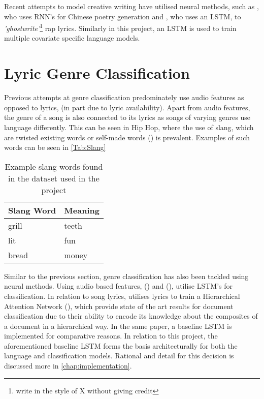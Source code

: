 \noindent
\newline
Recent attempts to model creative writing have utilised neural methods, such as \cite{Zhang2014}, who uses RNN's for Chinese poetry generation and \cite{Potash2015}, who uses an LSTM, to \textit{'ghostwrite'}\footnote{write in the style of X without giving credit} rap lyrics. Similarly in this project, an LSTM is used to train multiple covariate specific language models.

\section{Lyric Genre Classification}
Previous attempts at genre classification predominately use audio features as opposed to lyrics, (in part due to lyric availability). Apart from audio features, the genre of a song is also connected to its lyrics as songs of varying genres use language differently. This can be seen in Hip Hop, where the use of slang, which are twisted existing words or self-made words (\cite{Edwards2009}) is prevalent. Examples of such words can be seen in \autoref{Tab:Slang}
\begin{table}[ht]
	\centering
	\begin{tabular}{ | p{5cm} | p{5cm} |}
		\hline
		\textbf{Slang Word} & \textbf{Meaning}\\ \hline
		grill & teeth\\ \hline
		lit & fun\\ \hline
		bread & money \\ \hline
	\end{tabular}
	\caption[Example Slang Words]{Example slang words found in the dataset used in the project}
	\label{Tab:Slang}
\end{table}
\newline
Similar to the previous section, genre classification has also been tackled using neural methods. Using audio based features, (\cite{Irvin2016}) and (\cite{Pui2018}), utilise LSTM's for classification. In relation to song lyrics, \cite{Tsaptsinos2017} utilises lyrics to train a Hierarchical Attention Network (\cite{Yang2016}), which provide state of the art results for document classification due to their ability to encode its knowledge about the composites of a document in a hierarchical way. In the same paper, a baseline LSTM is implemented for comparative reasons. In relation to this project, the aforementioned baseline LSTM forms the basis architecturally for both the language and classification models. Rational and detail for this decision is discussed more in \autoref{chap:implementation}. 